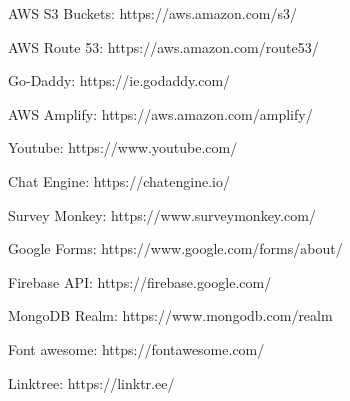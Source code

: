 \begin{thebibliography}{00}
 AWS S3 Buckets: https://aws.amazon.com/s3/

 AWS Route 53: https://aws.amazon.com/route53/

 Go-Daddy: https://ie.godaddy.com/

 AWS Amplify: https://aws.amazon.com/amplify/

 Youtube: https://www.youtube.com/

 Chat Engine: https://chatengine.io/

 Survey Monkey: https://www.surveymonkey.com/

 Google Forms: https://www.google.com/forms/about/

 Firebase API: https://firebase.google.com/

 MongoDB Realm: https://www.mongodb.com/realm

 Font awesome: https://fontawesome.com/

 Linktree: https://linktr.ee/ 

\end{thebibliography}





